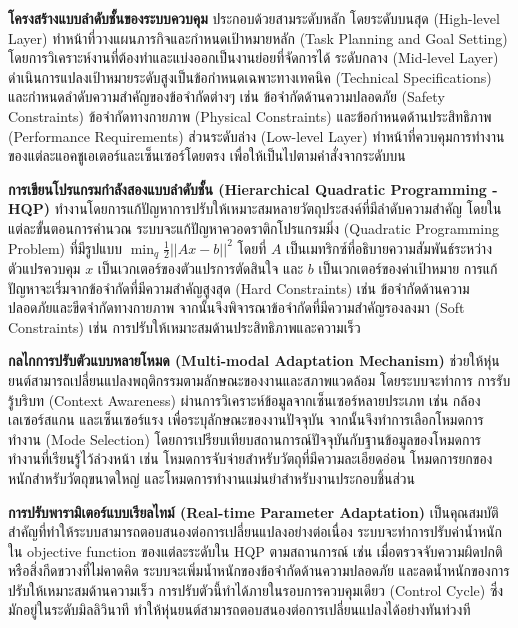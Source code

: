 \documentclass[a4paper]{article}
\begin{document}
\textbf{โครงสร้างแบบลำดับชั้นของระบบควบคุม} ประกอบด้วยสามระดับหลัก โดยระดับบนสุด (High-level Layer) ทำหน้าที่วางแผนภารกิจและกำหนดเป้าหมายหลัก (Task Planning and Goal Setting) โดยการวิเคราะห์งานที่ต้องทำและแบ่งออกเป็นงานย่อยที่จัดการได้ ระดับกลาง (Mid-level Layer) ดำเนินการแปลงเป้าหมายระดับสูงเป็นข้อกำหนดเฉพาะทางเทคนิค (Technical Specifications) และกำหนดลำดับความสำคัญของข้อจำกัดต่างๆ เช่น ข้อจำกัดด้านความปลอดภัย (Safety Constraints) ข้อจำกัดทางกายภาพ (Physical Constraints) และข้อกำหนดด้านประสิทธิภาพ (Performance Requirements) ส่วนระดับล่าง (Low-level Layer) ทำหน้าที่ควบคุมการทำงานของแต่ละแอคชูเอเตอร์และเซ็นเซอร์โดยตรง เพื่อให้เป็นไปตามคำสั่งจากระดับบน

\textbf{การเขียนโปรแกรมกำลังสองแบบลำดับชั้น (Hierarchical Quadratic Programming - HQP)} ทำงานโดยการแก้ปัญหาการปรับให้เหมาะสมหลายวัตถุประสงค์ที่มีลำดับความสำคัญ โดยในแต่ละขั้นตอนการคำนวณ ระบบจะแก้ปัญหาควอดราติกโปรแกรมมิ่ง (Quadratic Programming Problem) ที่มีรูปแบบ $\min_{q} \frac{1}{2}||Ax - b||^2$ โดยที่ $A$ เป็นเมทริกซ์ที่อธิบายความสัมพันธ์ระหว่างตัวแปรควบคุม $x$ เป็นเวกเตอร์ของตัวแปรการตัดสินใจ และ $b$ เป็นเวกเตอร์ของค่าเป้าหมาย การแก้ปัญหาจะเริ่มจากข้อจำกัดที่มีความสำคัญสูงสุด (Hard Constraints) เช่น ข้อจำกัดด้านความปลอดภัยและขีดจำกัดทางกายภาพ จากนั้นจึงพิจารณาข้อจำกัดที่มีความสำคัญรองลงมา (Soft Constraints) เช่น การปรับให้เหมาะสมด้านประสิทธิภาพและความเร็ว

\textbf{กลไกการปรับตัวแบบหลายโหมด (Multi-modal Adaptation Mechanism)} ช่วยให้หุ่นยนต์สามารถเปลี่ยนแปลงพฤติกรรมตามลักษณะของงานและสภาพแวดล้อม \parencite{ieee2019continuous} โดยระบบจะทำการ การรับรู้บริบท (Context Awareness) ผ่านการวิเคราะห์ข้อมูลจากเซ็นเซอร์หลายประเภท เช่น กล้อง เลเซอร์สแกน และเซ็นเซอร์แรง เพื่อระบุลักษณะของงานปัจจุบัน จากนั้นจึงทำการเลือกโหมดการทำงาน (Mode Selection) โดยการเปรียบเทียบสถานการณ์ปัจจุบันกับฐานข้อมูลของโหมดการทำงานที่เรียนรู้ไว้ล่วงหน้า เช่น โหมดการจับจ่ายสำหรับวัตถุที่มีความละเอียดอ่อน โหมดการยกของหนักสำหรับวัตถุขนาดใหญ่ และโหมดการทำงานแม่นยำสำหรับงานประกอบชิ้นส่วน

\textbf{การปรับพารามิเตอร์แบบเรียลไทม์ (Real-time Parameter Adaptation)} เป็นคุณสมบัติสำคัญที่ทำให้ระบบสามารถตอบสนองต่อการเปลี่ยนแปลงอย่างต่อเนื่อง ระบบจะทำการปรับค่าน้ำหนักใน objective function ของแต่ละระดับใน HQP ตามสถานการณ์ เช่น เมื่อตรวจจับความผิดปกติหรือสิ่งกีดขวางที่ไม่คาดคิด ระบบจะเพิ่มน้ำหนักของข้อจำกัดด้านความปลอดภัย และลดน้ำหนักของการปรับให้เหมาะสมด้านความเร็ว การปรับตัวนี้ทำได้ภายในรอบการควบคุมเดียว (Control Cycle) ซึ่งมักอยู่ในระดับมิลลิวินาที ทำให้หุ่นยนต์สามารถตอบสนองต่อการเปลี่ยนแปลงได้อย่างทันท่วงที
\end{document}
